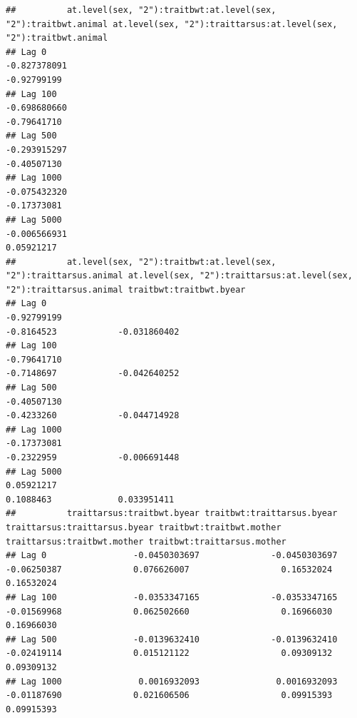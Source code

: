 \documentclass[
  12pt,
]{book}
\begin{document}
\begin{verbatim}
##          at.level(sex, "2"):traitbwt:at.level(sex, "2"):traitbwt.animal at.level(sex, "2"):traittarsus:at.level(sex, "2"):traitbwt.animal
## Lag 0                                                      -0.827378091                                                       -0.92799199
## Lag 100                                                    -0.698680660                                                       -0.79641710
## Lag 500                                                    -0.293915297                                                       -0.40507130
## Lag 1000                                                   -0.075432320                                                       -0.17373081
## Lag 5000                                                   -0.006566931                                                        0.05921217
##          at.level(sex, "2"):traitbwt:at.level(sex, "2"):traittarsus.animal at.level(sex, "2"):traittarsus:at.level(sex, "2"):traittarsus.animal traitbwt:traitbwt.byear
## Lag 0                                                          -0.92799199                                                           -0.8164523            -0.031860402
## Lag 100                                                        -0.79641710                                                           -0.7148697            -0.042640252
## Lag 500                                                        -0.40507130                                                           -0.4233260            -0.044714928
## Lag 1000                                                       -0.17373081                                                           -0.2322959            -0.006691448
## Lag 5000                                                        0.05921217                                                            0.1088463             0.033951411
##          traittarsus:traitbwt.byear traitbwt:traittarsus.byear traittarsus:traittarsus.byear traitbwt:traitbwt.mother traittarsus:traitbwt.mother traitbwt:traittarsus.mother
## Lag 0                 -0.0450303697              -0.0450303697                   -0.06250387              0.076626007                  0.16532024                  0.16532024
## Lag 100               -0.0353347165              -0.0353347165                   -0.01569968              0.062502660                  0.16966030                  0.16966030
## Lag 500               -0.0139632410              -0.0139632410                   -0.02419114              0.015121122                  0.09309132                  0.09309132
## Lag 1000               0.0016932093               0.0016932093                   -0.01187690              0.021606506                  0.09915393                  0.09915393

\end{verbatim}
\end{document}
